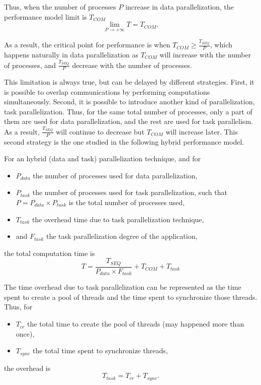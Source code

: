 Thus, when the number of processes $P$ increase in data parallelization, the performance model limit is $T_{COM}$
\begin{equation}
\lim\limits_{P \rightarrow +\infty} T = T_{COM}.
\end{equation}

As a result, the critical point for performance is when $T_{COM} \geq \frac{T_{SEQ}}{P}$, which happens naturally in data parallelization as $T_{COM}$ will increase with the number of processes, and $\frac{T_{SEQ}}{P}$ decrease with the number of processes.

This limitation is always true, but can be delayed by different strategies. First, it is possible to overlap communications by performing computations simultaneously. Second, it is possible to introduce another kind of parallelization, task parallelization. Thus, for the same total number of processes, only a part of them are used for data parallelization, and the rest are used for task parallelism. As a result, $\frac{T_{SEQ}}{P}$ will continue to decrease but $T_{COM}$ will increase later. This second strategy is the one studied in the following hybrid performance model.

For an hybrid (data and task) parallelization technique, and for
\begin{itemize}
\item $P_{data}$ the number of processes used for data parallelization,
\item $P_{task}$ the number of processes used for task parallelization, such that $P = P_{data} \times P_{task}$ is the total number of processes used,
\item $T_{task}$ the overhead time due to task parallelization technique,
\item and $F_{task}$ the task parallelization degree of the application,
\end{itemize}
the total computation time is
\begin{equation}
T = \frac{T_{SEQ}}{P_{data} \times F_{task}} + T_{COM} + T_{task}
\end{equation}

The time overhead due to task parallelization can be represented as the time spent to create a pool of threads and the time spent to synchronize those threads. Thus, for
\begin{itemize}
\item $T_{cr}$ the total time to create the pool of threads (may happened more than once), 
\item $T_{sync}$ the total time spent to synchronize threads, 
\end{itemize}
the overhead is
\begin{equation*}
T_{task} = T_{cr} + T_{sync}.
\end{equation*}

